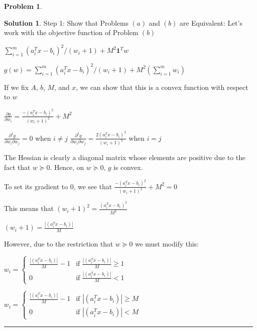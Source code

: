 \documentclass{article}
\theoremstyle{definition}
\newtheorem{problem}{Problem}
\def\fline{\rule{0.75\linewidth}{0.5pt}}
\newcommand{\finishline}{\begin{center}\fline\end{center}}
\newtheorem*{solution*}{Solution}
\newenvironment{solution}{\begin{solution*}}{{\finishline} \end{solution*}}
\begin{document}
\begin{problem}
\begin{solution}
Step 1: Show that Problems $(a)$ and $(b)$ are Equivalent: \newline 
Let's work with the objective function of Problem $(b)$ \newline 

$\sum_{i=1}^{m} (a_i^T x - b_i)^2/(w_i + 1) + M^2\textbf{1}^Tw$ \newline 

$g(w) = \sum_{i=1}^{m} (a_i^T x - b_i)^2/(w_i + 1) + M^2(\sum_{i=1}^{m} w_i)$ \newline 

If we fix $A$, $b$, $M$, and $x$, we can show that this is a convex function with respect to $w$ \newline

$\frac{\partial g}{\partial w_i} = \frac{-(a_i^T x - b_i)^2}{(w_i + 1)^2} + M^2$ \newline

$\frac{\partial^2g}{\partial w_i \partial w_j} = 0$ when $i \neq j$ \newline
$\frac{\partial^2g}{\partial w_i \partial w_j} = \frac{2(a_i^T x - b_i)^2}{(w_i + 1)^3}$ when $i = j$ \newline

The Hessian is clearly a diagonal matrix whose elements are positive due to the fact that $w \succeq 0$. Hence, on $w \succeq 0$, $g$ is convex. 

To set its gradient to 0, we see that $\frac{-(a_i^T x - b_i)^2}{(w_i + 1)^2} + M^2 = 0$

This means that $(w_i + 1)^2 = \frac{(a_i^T x - b_i)^2}{M^2}$ \newline 

$(w_i + 1) = \frac{|(a_i^T x - b_i)|}{M}$ \newline 

However, due to the restriction that $w \succeq 0$ we must modify this: \newline

$w_i = \begin{cases} 
      \frac{|(a_i^T x - b_i)|}{M} - 1 & \text{if } \frac{|(a_i^T x - b_i)|}{M} \geq 1 \\
      0 & \text{if } \frac{|(a_i^T x - b_i)|}{M} < 1 
   \end{cases}$

$w_i = \begin{cases} 
      \frac{|(a_i^T x - b_i)|}{M} - 1 & \text{if } |(a_i^T x - b_i)| \geq M \\
      0 & \text{if } |(a_i^T x - b_i)| < M
   \end{cases}$


\end{solution}
\end{problem}
\end{document}
